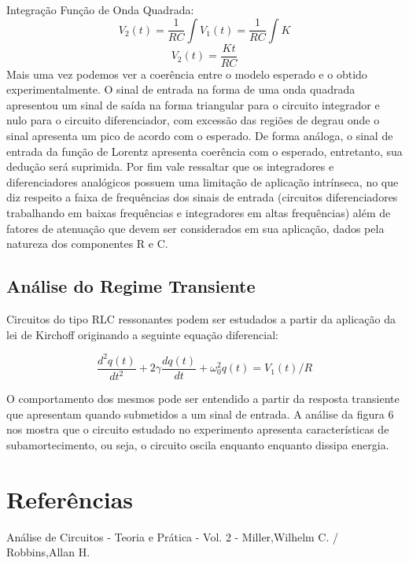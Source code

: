 \documentclass[a4paper]{article}
\begin{document}
Integração Função de Onda Quadrada:
\begin{equation*} 
V_{2}(t)=\frac{1}{RC}\int V_{1}(t)=\frac{1}{RC}\int K
\end{equation*}
\begin{equation*} 
V_{2}(t)=\frac{Kt}{RC}
\end{equation*}
Mais uma vez podemos ver a coerência entre o modelo esperado e o obtido experimentalmente. O sinal de entrada na forma de uma onda quadrada apresentou um sinal de saída na forma triangular para o circuito integrador e nulo para o circuito diferenciador, com excessão das regiões de degrau onde o sinal apresenta um pico de acordo com o esperado. De forma análoga, o sinal de entrada da função de Lorentz apresenta coerência com o esperado, entretanto, sua dedução será suprimida. Por fim vale ressaltar que os integradores e diferenciadores analógicos possuem uma limitação de aplicação intrínseca, no que diz respeito a faixa de frequências dos sinais de entrada (circuitos diferenciadores trabalhando em baixas frequências e integradores em altas frequências) além de fatores de atenuação que devem ser considerados em sua aplicação, dados pela natureza dos componentes R e C. 

\subsection{Análise do Regime Transiente}
Circuitos do tipo RLC ressonantes podem ser estudados a partir da aplicação da lei de Kirchoff originando a seguinte equação diferencial:

\begin{equation}
\frac{d^2q(t)}{dt^2}+2\gamma \frac{dq(t)}{dt}+\omega_{0}^2q(t)=V_{1}(t)/R
\end{equation}

O comportamento dos mesmos pode ser entendido a partir da resposta transiente que apresentam quando submetidos a um sinal de entrada. A análise da figura 6 nos mostra que o circuito estudado no experimento apresenta características de subamortecimento, ou seja, o circuito oscila enquanto enquanto dissipa energia. 



  \section{Referências}

  Análise de Circuitos - Teoria e Prática - Vol. 2 -
  Miller,Wilhelm C. / Robbins,Allan H.
        
\end{document}
